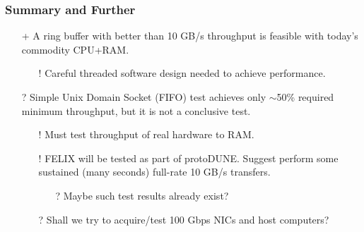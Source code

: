 \documentclass[xcolor=dvipsnames]{beamer}
\begin{document}
\begin{frame}
  \frametitle{Summary and Further}
  \begin{itemize}
  \item[+] A ring buffer with better than 10 GB/s throughput is feasible
    with today's commodity CPU+RAM.
    \begin{itemize}\footnotesize
    \item[!] Careful threaded software design needed to achieve performance.
    \end{itemize}
  \item[?] Simple Unix Domain Socket (FIFO) test achieves only $\sim$50\%
    required minimum throughput,  but it is not a conclusive test.
    \begin{itemize}\footnotesize
    \item[!] Must test throughput of real hardware to RAM.
    \item[!] FELIX will be tested as part of protoDUNE.  Suggest perform
      some sustained (many seconds) full-rate 10 GB/s transfers.
      \begin{itemize}\scriptsize
      \item[?] Maybe such test results already exist?
      \end{itemize}
    \item[?] Shall we try to acquire/test 100 Gbps NICs and host computers?
    \end{itemize}
  \end{itemize}
\end{frame}
\end{document}
